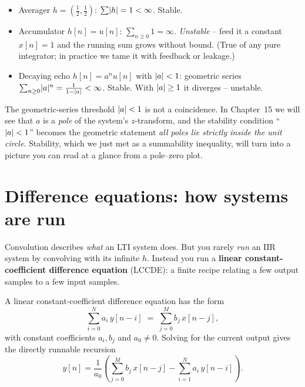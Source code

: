 \begin{example}
\begin{itemize}
  \item Averager $h=(\tfrac12,\tfrac12)$: $\sum\lvert h\rvert=1<\infty$. Stable.
  \item Accumulator $h[n]=u[n]$: $\sum_{n\ge0}1=\infty$. \emph{Unstable} -- feed
        it a constant $x[n]=1$ and the running sum grows without bound. (True of
        any pure integrator; in practice we tame it with feedback or leakage.)
  \item Decaying echo $h[n]=a^n u[n]$ with $\lvert a\rvert<1$: geometric series
        $\sum_{n\ge0}\lvert a\rvert^n = \tfrac{1}{1-\lvert a\rvert}<\infty$. Stable. With
        $\lvert a\rvert\ge1$ it diverges -- unstable.
\end{itemize}
\end{example}

\begin{connectionbox}
The geometric-series threshold $\lvert a\rvert<1$ is not a coincidence. In Chapter~15 we
will see that $a$ is a \emph{pole} of the system's $z$-transform, and the
stability condition ``$\lvert a\rvert<1$'' becomes the geometric statement
\emph{all poles lie strictly inside the unit circle}. Stability, which we just
met as a summability inequality, will turn into a picture you can read at a
glance from a pole--zero plot.
\end{connectionbox}

\section{Difference equations: how systems are run}
\label{ch12:diffeq}

Convolution describes \emph{what} an LTI system does. But you rarely \emph{run}
an IIR system by convolving with its infinite $h$. Instead you run a
\textbf{linear constant-coefficient difference equation} (LCCDE): a finite recipe
relating a few output samples to a few input samples.

\begin{definition}[LCCDE]
\label{ch12:def-lccde}
A linear constant-coefficient difference equation has the form
\[
  \sum_{i=0}^{N} a_i\,y[n-i] \;=\; \sum_{j=0}^{M} b_j\,x[n-j],
\]
with constant coefficients $a_i, b_j$ and $a_0\ne0$. Solving for the current
output gives the directly runnable recursion
\[
  y[n] = \frac{1}{a_0}\left( \sum_{j=0}^{M} b_j\,x[n-j]
                            - \sum_{i=1}^{N} a_i\,y[n-i] \right).
\]
\end{definition}

